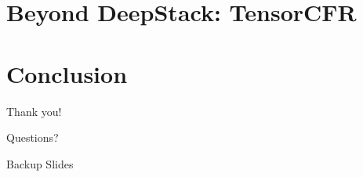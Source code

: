 \documentclass{beamer}
\begin{document}

  \section{Beyond DeepStack: TensorCFR}


  \section{Conclusion}

  \begin{frame}[standout]
    \begin{center}
      Thank you!

      Questions?
    \end{center}
  \end{frame}


  \appendix
  \begin{frame}[standout]
    Backup Slides
  \end{frame}
\end{document}
